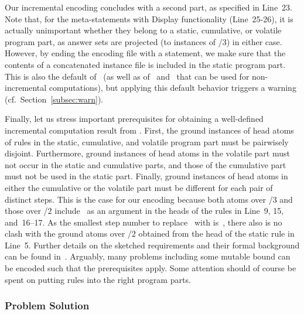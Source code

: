 Our incremental encoding concludes with a second  part,
as specified in Line~23.
Note that, for the meta-statements with Display functionality (Line~25-26),
it is actually unimportant whether they belong to a static, cumulative, or
volatile program part, as answer sets are projected
(to instances of /$3$) in either case.
However, by ending the encoding file with a  statement,
we make sure that the contents of a concatenated instance file
is included in the static program part.
This is also the default of \iclingo\
(as well as of \gringo\ and \clingo\ that can be used for non-incremental computations),
but applying this default behavior triggers a warning (cf.\ Section~\ref{subsec:warn}).%

Finally, let us stress important prerequisites for obtaining
a well-defined incremental computation result from \iclingo.
First, the ground instances of head atoms of rules in the
static, cumulative, and volatile program part must be pairwisely disjoint.
Furthermore, ground instances of head atoms in the volatile part
must not occur in the static and cumulative parts,
and those of the cumulative part must not be used in the static part.
Finally, ground instances of head atoms in either the cumulative or the volatile part
must be different for each pair of distinct steps.
This is the case for our encoding because both atoms over \pred{move}/$3$
and those over \pred{holds}/$2$ include~ as an argument in the
heads of the rules in Line~9, 15, and~16--17.
As the smallest step number to replace~\const{t} with is~\const{1},
there also is no clash with the ground atoms over /$2$
obtained from the head of the static rule in Line~5.
Further details on the sketched requirements and their formal background can
be found in~\cite{gekakaosscth08a}.
Arguably, many problems including some mutable bound can be encoded
such that the prerequisites apply.
Some attention should of course be spent on
putting rules into the right program parts.


\subsubsection{Problem Solution}\label{subsec:block:solution}

